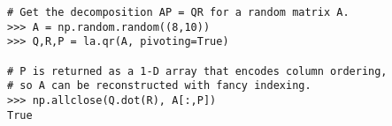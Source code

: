 \begin{lstlisting}
# Get the decomposition AP = QR for a random matrix A.
>>> A = np.random.random((8,10))
>>> Q,R,P = la.qr(A, pivoting=True)

# P is returned as a 1-D array that encodes column ordering,
# so A can be reconstructed with fancy indexing.
>>> np.allclose(Q.dot(R), A[:,P])
True
\end{lstlisting}

\begin{comment}
\subsection*{Stability of the QR Decomposition in SciPy} %

SciPy's QR factorization routine uses Householder reflections.
Though this routine is numerically stable, there are still potential numerical problems.
Consider the following example.

\begin{lstlisting}
# Generate a random orthonormal matrix and a random upper-triangular matrix.
>>> Q, _ = la.qr(np.random.normal(size=(500,500)))
>>> R  = np.triu(np.random.normal(size=(500,500)))

# Calculate A = QR, noting that Q and R are the EXACT QR decomposition of A.
>>> A = np.dot(Q,R)

# Use SciPy to rediscover the QR decomposition of A.
>>> Q1, R1 = la.qr(A)

# Compare the true Q and R to the computed Q1 and R1.
>>> print la.norm(Q1-Q, <<ord>>=np.inf) / la.norm(Q, <<ord>>=np.inf)
1.21169651649

>>> print la.norm(R1-R, <<ord>>=np.inf) / la.norm(R, <<ord>>=np.inf)
1.72312747194
\end{lstlisting}

This is terrible!
This algorithm works in $16$ decimal points of precision, but $Q_1$ and $R_1$ are accurate to $0$ decimal points.
These errors in $Q_1$ and $R_1$ are called \emph{forward errors}.
Even so, miraculously, the product $Q_1 R_1$ is very close $A$.

\begin{lstlisting}
>>> A1 = Q1.dot(R1)
>>> la.norm(A1 - A, <<ord>>=np.inf) / la.norm(A, <<ord>>=np.inf)
3.353843164496928e-15
\end{lstlisting}

The error in $A_1$, called the \emph{backward error}, is very small.
This shows that the errors in $Q_1$ and $R_1$ are somehow ``correlated,'' so that they cancel out in the product.
In fact, the large errors in $Q_1$ and $R_1$ are not because the algorithm is bad, but rather because $A$ was \emph{poorly conditioned} to begin with.
Conditioning and stability will be discussed more in depth later in the curriculum.
\end{comment}

